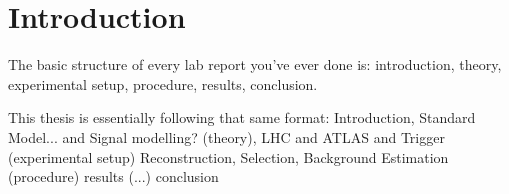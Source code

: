 \chapter{Introduction}\label{chapter:introduction}

The basic structure of every lab report you've ever done is: 
    introduction,
    theory,
    experimental setup,
    procedure,
    results,
    conclusion.

This thesis is essentially following that same format:
    Introduction,
    Standard Model... and Signal modelling? (theory),
    LHC and ATLAS and Trigger (experimental setup)
    Reconstruction, Selection, Background Estimation (procedure)
    results (...)
    conclusion

%


